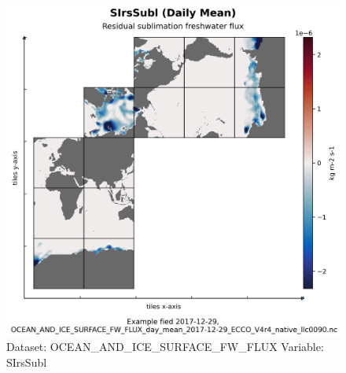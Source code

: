 \begin{figure}[H]
\centering
\includegraphics[scale=0.55]{../images/plots/native_plots/Ocean_and_Sea-Ice_Surface_Freshwater_Fluxes/SIrsSubl.png}
\caption{Dataset: OCEAN\_AND\_ICE\_SURFACE\_FW\_FLUX Variable: SIrsSubl}
\label{tab:table-OCEAN_AND_ICE_SURFACE_FW_FLUX_SIrsSubl-Plot}
\end{figure}
\pagebreak
